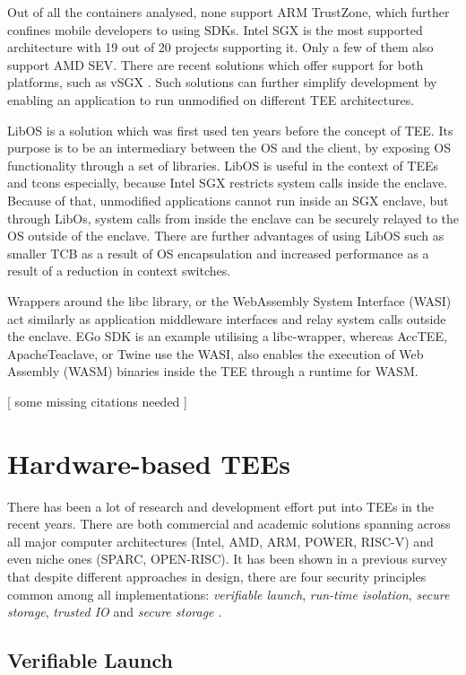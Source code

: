 \documentclass[runningheads,a4paper]{uwsese}
\begin{document}
Out of all the containers analysed, none support ARM TrustZone, which further
confines mobile developers to using SDKs. Intel SGX is the most supported
architecture with 19 out of 20 projects supporting it. Only a few of them also
support AMD SEV. There are recent solutions which offer support for both
platforms, such as vSGX \cite{vsgx}. Such solutions can further simplify
development by enabling an application to run unmodified on different TEE
architectures.

LibOS \cite{libos} is a solution which was first used ten years before the
concept of TEE. Its purpose is to be an intermediary between the OS and the
client, by exposing OS functionality through a set of libraries. LibOS is
useful in the context of TEEs and tcons especially, because Intel SGX restricts
system calls inside the enclave. Because of that, unmodified applications
cannot run inside an SGX enclave, but through LibOs, system calls from inside
the enclave can be securely relayed to the OS outside of the enclave. There are
further advantages of using LibOS such as smaller TCB as a result of OS
encapsulation and increased performance as a result of a reduction in context
switches.

Wrappers around the libc library, or the WebAssembly System Interface (WASI)
act similarly as application middleware interfaces and relay system calls
outside the enclave. EGo SDK is an example utilising a libc-wrapper, whereas
AccTEE, ApacheTeaclave, or Twine use the WASI, also enables the execution of
Web Assembly (WASM) binaries inside the TEE through a runtime for WASM.

[ some missing citations needed ] 

\section{Hardware-based TEEs}

There has been a lot of research and development effort put into TEEs in the
recent years. There are both commercial and academic solutions spanning across
all major computer architectures (Intel, AMD, ARM, POWER, RISC-V) and even
niche ones (SPARC, OPEN-RISC). It has been shown in a previous survey that
despite different approaches in design, there are four security principles
common among all implementations: \emph{verifiable launch}, \emph{run-time
isolation}, \emph{secure storage}, \emph{trusted IO} and \emph{secure storage}
\cite{tee_hw_sup}.

\subsection{Verifiable Launch}
\end{document}
